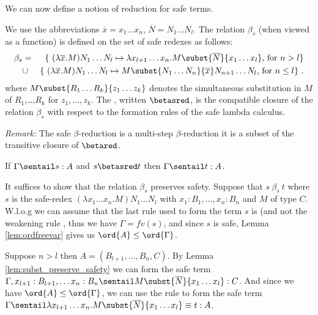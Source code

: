 We can now define a notion of reduction for safe terms.
\begin{definition}\rm
\label{dfn:safereduction} We use the abbreviations $\overline{x} =
x_1 \ldots x_n$, $\overline{N} = N_1 \ldots N_l$. The relation
$\beta_s$ (when viewed as a function) is defined on the set of safe
redexes as follows:
\begin{eqnarray*}
  \beta_s &=&
  \{  \ (\lambda \overline{x} . M) N_1 \ldots N_l \mapsto \lambda x_{l+1} \ldots x_n. M\subst{\overline{N}}{x_1 \ldots x_l} \mbox{, for $n> l$}
  \} \\
  &\cup&
  \{ \ (\lambda \overline{x}  . M) N_1 \ldots N_l \mapsto M\subst{N_1 \ldots N_n}{\overline{x}} N_{n+1} \ldots N_l
  \mbox{, for $n\leq l$} \} \ .
\end{eqnarray*}
where $M\subst{R_1 \ldots R_k}{z_1 \ldots z_k}$ denotes the simultaneous substitution in $M$ of $R_1$,\ldots,$R_k$ for $z_1, \ldots, z_k$.  The
, written $\betasred$, is the
compatible closure of the relation $\beta_s$ with respect to the
formation rules of the safe lambda calculus.
\end{definition}

\noindent \emph{Remark:} The safe $\beta$-reduction is a multi-step
$\beta$-reduction \ie it is a subset of the transitive closure of
$\betared$.


\begin{lemma}
\label{lem:safered_preserve_safety}
If $\Gamma \sentail s :A$ and $s \betasred t$ then $\Gamma \sentail t :A$.
\end{lemma}

\proof
  It suffices to show that the relation $\beta_s$ preserves safety.
Suppose that $s\ \beta_s\ t$ where $s$ is the
safe-redex $(\lambda x_1 \ldots x_n . M) N_1
  \ldots N_l $ with $x_1 : B_1, \ldots, x_n: B_n$
and $M$ of type $C$.  W.l.o.g we can assume that the last rule used
to form the term $s$ is  (and not the weakening rule
, thus  we have $\Gamma = fv(s)$, and since $s$ is
safe, Lemma \ref{lem:ordfreevar} gives us $\ord{A} \leq
\ord{\Gamma}$.

Suppose $n>l$ then $A = (B_{l+1}, \ldots, B_n, C)$. By Lemma
\ref{lem:subst_preserve_safety} we can form the safe term $\Gamma,
x_{l+1}:B_{l+1}, \ldots x_n :B_{n}\sentail M\subst{\overline{N}}{x_1
\ldots x_l} : C$. And since we have $\ord{A} \leq \ord{\Gamma}$, we
can use the  rule to form the safe term $\Gamma
\sentail \lambda x_{l+1} \ldots x_n . M\subst{\overline{N}}{x_1
\ldots x_l} \equiv t : A$.

